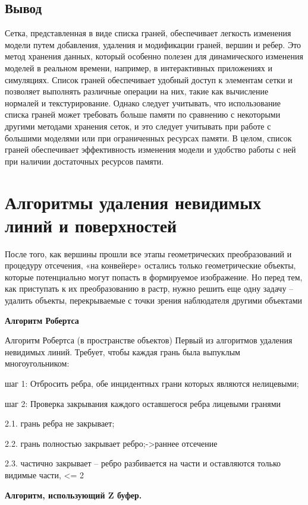 \subsection{Вывод}

Сетка, представленная в виде списка граней, обеспечивает легкость изменения модели путем добавления, удаления и модификации граней, вершин и ребер. Это метод хранения данных, который особенно полезен для динамического изменения моделей в реальном времени, например, в интерактивных приложениях и симуляциях. Список граней обеспечивает удобный доступ к элементам сетки и позволяет выполнять различные операции на них, такие как вычисление нормалей и текстурирование. Однако следует учитывать, что использование списка граней может требовать больше памяти по сравнению с некоторыми другими методами хранения сеток, и это следует учитывать при работе с большими моделями или при ограниченных ресурсах памяти. В целом, список граней обеспечивает эффективность изменения модели и удобство работы с ней при наличии достаточных ресурсов памяти.

\section{Алгоритмы удаления невидимых линий и поверхностей}

После того, как вершины прошли все этапы геометрических преобразований и процедуру
отсечения, «на конвейере» остались только геометрические объекты, которые потенциально могут
попасть в формируемое изображение. Но перед тем, как приступать к их преобразованию в растр,
нужно решить еще одну задачу – удалить объекты, перекрываемые с точки зрения наблюдателя
другими объектами 

\textbf{Алгоритм Робертса}

Алгоритм Робертса (в пространстве объектов)
Первый из алгоритмов удаления невидимых линий. Требует,
чтобы каждая грань была выпуклым многоугольником:

шаг 1: Отбросить ребра, обе инцидентных грани которых
являются нелицевыми;

шаг 2: Проверка закрывания каждого оставшегося ребра
лицевыми гранями

2.1. грань ребра не закрывает;

2.2. грань полностью закрывает ребро;->раннее отсечение

2.3. частично закрывает – ребро разбивается на части и
оставляются только видимые части, <= 2 

\textbf{Алгоритм, использующий Z буфер.}

